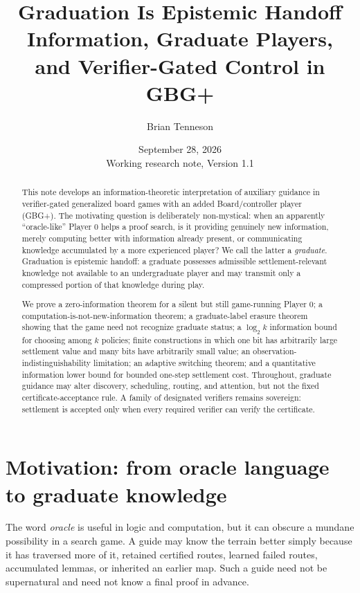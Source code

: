 \documentclass[11pt]{article}
\title{\textbf{Graduation Is Epistemic Handoff}\\[4pt]
\large Information, Graduate Players, and Verifier-Gated Control in GBG+}
\author{Brian Tenneson}
\date{September 28, 2026\\Working research note, Version 1.1}
\theoremstyle{definition}
\begin{document}
\maketitle

\begin{abstract}
This note develops an information-theoretic interpretation of auxiliary guidance in verifier-gated generalized board games with an added Board/controller player (GBG+).  The motivating question is deliberately non-mystical: when an apparently ``oracle-like'' Player 0 helps a proof search, is it providing genuinely new information, merely computing better with information already present, or communicating knowledge accumulated by a more experienced player?  We call the latter a \emph{graduate}.  Graduation is epistemic handoff: a graduate possesses admissible settlement-relevant knowledge not available to an undergraduate player and may transmit only a compressed portion of that knowledge during play.

We prove a zero-information theorem for a silent but still game-running Player 0; a computation-is-not-new-information theorem; a graduate-label erasure theorem showing that the game need not recognize graduate status; a $\log_2 k$ information bound for choosing among $k$ policies; finite constructions in which one bit has arbitrarily large settlement value and many bits have arbitrarily small value; an observation-indistinguishability limitation; an adaptive switching theorem; and a quantitative information lower bound for bounded one-step settlement cost.  Throughout, graduate guidance may alter discovery, scheduling, routing, and attention, but not the fixed certificate-acceptance rule.  A family of designated verifiers remains sovereign: settlement is accepted only when every required verifier can verify the certificate.
\end{abstract}

\section{Motivation: from oracle language to graduate knowledge}

The word \emph{oracle} is useful in logic and computation, but it can obscure a mundane possibility in a search game.  A guide may know the terrain better simply because it has traversed more of it, retained certified routes, learned failed routes, accumulated lemmas, or inherited an earlier map.  Such a guide need not be supernatural and need not know a final proof in advance.
\end{document}
